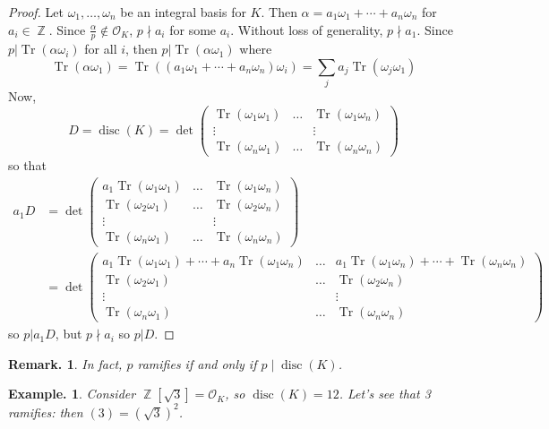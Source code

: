 \documentclass[11pt, a4paper]{memoir}
\DeclareMathOperator{\Z}{{\mathbb{Z}}}
\theoremstyle{change}
\theoremstyle{plain}
\theoremstyle{nonumberplain}
\newtheorem{example}{Example.}
\newtheorem{remark}{Remark.}
\newtheorem{proof}{Proof}
\DeclareMathOperator{\disc}{disc}
\DeclareMathOperator{\Tr}{Tr}
\begin{document}
\begin{proof}
    Let $\omega_1,\ldots,\omega_n$ be an integral basis for $K$.
    Then $\alpha=a_1\omega_1+\cdots+a_n\omega_n$ for $a_i\in\Z$.
    Since $\frac{\alpha}{p}\notin\mathcal{O}_K$, $p\nmid a_i$ for some $a_i$.
    Without loss of generality, $p\nmid a_1$.
    Since $p|\Tr(\alpha\omega_i)$ for all $i$, then $p|\Tr(\alpha\omega_1)$ where
    \begin{equation*}
        \Tr(\alpha\omega_1)=\Tr((a_1\omega_1+\cdots+a_n\omega_n)\omega_i)=\sum_j a_j\Tr(\omega_j\omega_1)
    \end{equation*}
    Now,
    \begin{equation*}
        D=\disc(K)=\det
        \begin{pmatrix}
            \Tr(\omega_1\omega_1) &\hdots&\Tr(\omega_1\omega_n)\\
            \vdots&&\vdots\\
            \Tr(\omega_n\omega_1) &\hdots&\Tr(\omega_n\omega_n)
        \end{pmatrix}
    \end{equation*}
    so that
    \begin{align*}
        a_1D &=\det
        \begin{pmatrix}
            a_1\Tr(\omega_1\omega_1) &\hdots&\Tr(\omega_1\omega_n)\\
            \Tr(\omega_2\omega_1) &\hdots&\Tr(\omega_2\omega_n)\\
            \vdots&&\vdots\\
            \Tr(\omega_n\omega_1) &\hdots&\Tr(\omega_n\omega_n)
        \end{pmatrix}\\
        &=\det
        \begin{pmatrix}
            a_1\Tr(\omega_1\omega_1)+\cdots+a_n\Tr(\omega_1\omega_n) &\hdots &a_1\Tr(\omega_1\omega_n)+\cdots+\Tr(\omega_n\omega_n)\\
            \Tr(\omega_2\omega_1) &\hdots&\Tr(\omega_2\omega_n)\\
            \vdots&&\vdots\\
            \Tr(\omega_n\omega_1) &\hdots&\Tr(\omega_n\omega_n)
        \end{pmatrix}
    \end{align*}
    so $p|a_1D$, but $p\nmid a_i$ so $p|D$.
\end{proof}
\begin{remark}
    In fact, $p$ ramifies if and only if $p\mid\disc(K)$.
\end{remark}
\begin{example}
    Consider $\Z[\sqrt{3}]=\mathcal{O}_K$, so $\disc(K)=12$.
    Let's see that 3 ramifies: then $(3)=(\sqrt{3})^2$.
\end{example}
\end{document}

